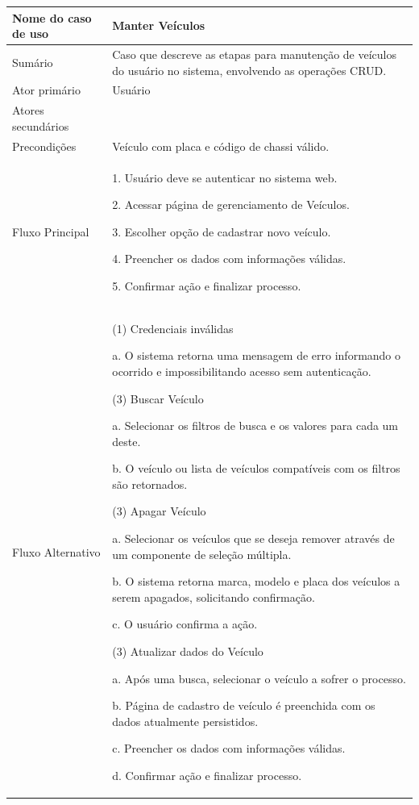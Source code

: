 \begin{flushleft}
\tablefirsthead{}
\tablehead{}
\tabletail{}
\tablelasttail{}
\begin{supertabular}{|m{5.5680003cm}|m{9.325cm}|}
\hline
Nome do caso de uso &
Manter Veículos\\\hline
Sumário &
Caso que descreve as etapas para manutenção de veículos do usuário no sistema, envolvendo as operações CRUD.\\\hline
Ator primário &
Usuário\\\hline
Atores secundários &
~
\\\hline
Precondições &
Veículo com placa e código de chassi válido.\\\hline
Fluxo Principal &
1. Usuário deve se autenticar no sistema web.

2. Acessar página de gerenciamento de Veículos.

3. Escolher opção de cadastrar novo veículo.

4. Preencher os dados com informações válidas.

5. Confirmar ação e finalizar processo.\\\hline
Fluxo Alternativo &
(1) Credenciais inválidas

a. O sistema retorna uma mensagem de erro informando o ocorrido e impossibilitando acesso sem autenticação.

(3) Buscar Veículo

a. Selecionar os filtros de busca e os valores para cada um deste.

b. O veículo ou lista de veículos compatíveis com os filtros são retornados.

(3) Apagar Veículo

a. Selecionar os veículos que se deseja remover através de um componente de seleção múltipla.

b. O sistema retorna marca, modelo e placa dos veículos a serem apagados, solicitando confirmação.

c. O usuário confirma a ação.

(3) Atualizar dados do Veículo

a. Após uma busca, selecionar o veículo a sofrer o processo.

b. Página de cadastro de veículo é preenchida com os dados atualmente persistidos.

c. Preencher os dados com informações válidas.

d. Confirmar ação e finalizar processo.


\end{supertabular}
\end{flushleft}
